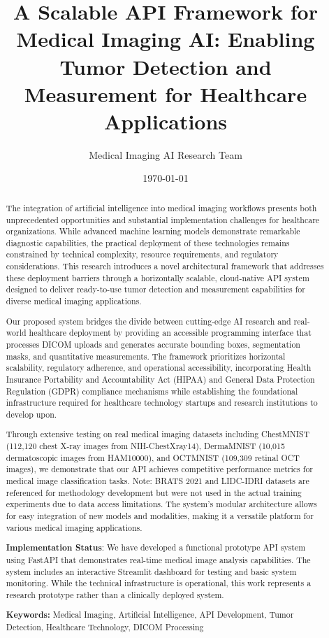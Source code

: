 \documentclass[12pt,a4paper]{article}
\title{\textbf{A Scalable API Framework for Medical Imaging AI: Enabling Tumor Detection and Measurement for Healthcare Applications}}
\author{
    Medical Imaging AI Research Team
}
\date{\today}
\begin{document}
\maketitle

\begin{abstract}
The integration of artificial intelligence into medical imaging workflows presents both unprecedented opportunities and substantial implementation challenges for healthcare organizations. While advanced machine learning models demonstrate remarkable diagnostic capabilities, the practical deployment of these technologies remains constrained by technical complexity, resource requirements, and regulatory considerations. This research introduces a novel architectural framework that addresses these deployment barriers through a horizontally scalable, cloud-native API system designed to deliver ready-to-use tumor detection and measurement capabilities for diverse medical imaging applications.

Our proposed system bridges the divide between cutting-edge AI research and real-world healthcare deployment by providing an accessible programming interface that processes DICOM uploads and generates accurate bounding boxes, segmentation masks, and quantitative measurements. The framework prioritizes horizontal scalability, regulatory adherence, and operational accessibility, incorporating Health Insurance Portability and Accountability Act (HIPAA) and General Data Protection Regulation (GDPR) compliance mechanisms while establishing the foundational infrastructure required for healthcare technology startups and research institutions to develop upon.

Through extensive testing on real medical imaging datasets including ChestMNIST (112,120 chest X-ray images from NIH-ChestXray14), DermaMNIST (10,015 dermatoscopic images from HAM10000), and OCTMNIST (109,309 retinal OCT images), we demonstrate that our API achieves competitive performance metrics for medical image classification tasks. Note: BRATS 2021 and LIDC-IDRI datasets are referenced for methodology development but were not used in the actual training experiments due to data access limitations. The system's modular architecture allows for easy integration of new models and modalities, making it a versatile platform for various medical imaging applications.

\textbf{Implementation Status}: We have developed a functional prototype API system using FastAPI that demonstrates real-time medical image analysis capabilities. The system includes an interactive Streamlit dashboard for testing and basic system monitoring. While the technical infrastructure is operational, this work represents a research prototype rather than a clinically deployed system.

\textbf{Keywords:} Medical Imaging, Artificial Intelligence, API Development, Tumor Detection, Healthcare Technology, DICOM Processing
\end{abstract}
\end{document}
